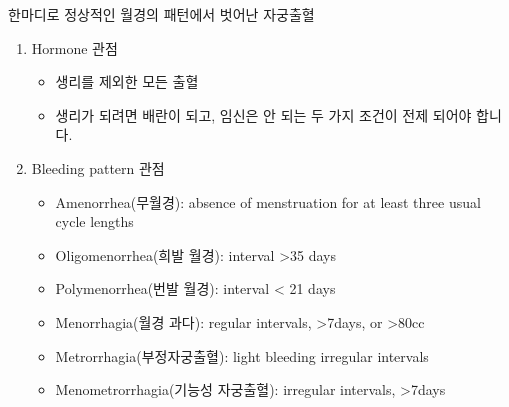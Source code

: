 한마디로 정상적인 월경의 패턴에서 벗어난 자궁출혈 
\begin{enumerate}\tightlist
\item Hormone  관점
	\begin{itemize}[-]\tightlist
	\item 생리를 제외한 모든 출혈
	\item 생리가 되려면 배란이 되고, 임신은 안 되는 두 가지 조건이 전제 되어야 합니다.
	\end{itemize}
\item Bleeding pattern  관점
	\begin{itemize}[-]\tightlist
	\item Amenorrhea(무월경): absence of menstruation for at least three usual cycle lengths 
	\item Oligomenorrhea(희발 월경): interval >35 days 
	\item Polymenorrhea(번발 월경): interval < 21 days
	\item Menorrhagia(월경 과다): regular intervals, >7days, or >80cc
	\item Metrorrhagia(부정자궁출혈): light bleeding irregular intervals 
	\item Menometrorrhagia(기능성 자궁출혈): irregular intervals, >7days 
	\end{itemize}
\end{enumerate}


